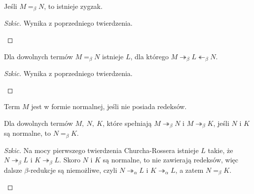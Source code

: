 \begin{theorem}
    Jeśli \( M =_{\beta} N \), to istnieje zygzak.
\end{theorem}
\begin{proof}[Szkic]
    Wynika z poprzedniego twierdzenia.
    \begin{center}
        
    \end{center}
\end{proof}

\begin{theorem}
    Dla dowolnych termów \( M =_{\beta} N \) istnieje \( L \), dla którego \( M \twoheadrightarrow_{\beta} L \twoheadleftarrow_{\beta} N \).
\end{theorem}
\begin{proof}[Szkic]
    Wynika z poprzedniego twierdzenia.
    \begin{center}
        
    \end{center}
\end{proof}

Term \( M \) jest w formie normalnej, jeśli nie posiada redeksów.

\begin{theorem}
    Dla dowolnych termów \( M, \ N, \ K \), które spełniają \( M \twoheadrightarrow_{\beta} N \) i \( M \twoheadrightarrow_{\beta} K \), jeśli \( N \) i \( K \) są normalne, to \( N =_{\beta} K \).
\end{theorem}
\begin{proof}[Szkic]
    Na mocy pierwszego twierdzenia Churcha-Rossera istnieje \( L \) takie, że \( N \twoheadrightarrow_{\beta} L \) i \( K \twoheadrightarrow_{\beta} L \).
    Skoro \( N \) i \( K \) są normalne, to nie zawierają redeksów, więc dalsze \( \beta \)-redukcje są niemożliwe, czyli \( N \twoheadrightarrow_{\alpha} L \) i \( K \twoheadrightarrow_{\alpha} L \), a zatem \( N =_{\beta} K \).
    \begin{center}
        
    \end{center}
\end{proof}
